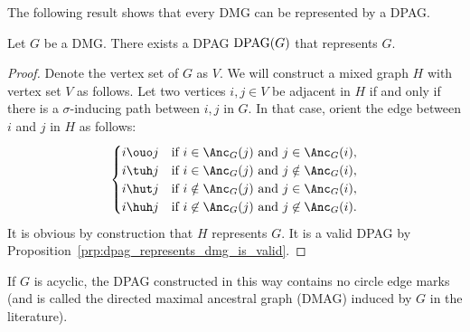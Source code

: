 The following result shows that every DMG can be represented by a DPAG.
\begin{Prp}\label{prp:from_dmg_to_dpag}
  Let $G$ be a DMG. There exists a DPAG $\mathrm{DPAG}(G)$ that represents $G$.
\end{Prp}
\begin{proof}
  Denote the vertex set of $G$ as $V$.
  We will construct a mixed graph $H$ with vertex set $V$ as follows.
  Let two vertices $i,j \in V$ be adjacent in $H$ if and only if there is a $\sigma$-inducing path between $i,j$ in $G$.
  In that case, orient the edge between $i$ and $j$ in $H$ as follows:
    $$\begin{cases}
      \text{$i \ouo j$} & \text{if $i \in \Anc_G(j)$ and $j \in \Anc_G(i)$}, \\
      \text{$i \tuh  j$} & \text{if $i \in \Anc_G(j)$ and $j \notin \Anc_G(i)$}, \\
      \text{$i \hut  j$} & \text{if $i \notin \Anc_G(j)$ and $j \in \Anc_G(i)$}, \\
      \text{$i \huh j$} & \text{if $i \not\in \Anc_G(j)$ and $j \not\in \Anc_G(i)$.}
    \end{cases}$$
  It is obvious by construction that $H$ represents $G$.
  It is a valid DPAG by Proposition~\ref{prp:dpag_represents_dmg_is_valid}.
\end{proof}
If $G$ is acyclic, the DPAG constructed in this way contains no circle edge marks (and is called the directed maximal ancestral graph (DMAG) induced by $G$ in the literature).

